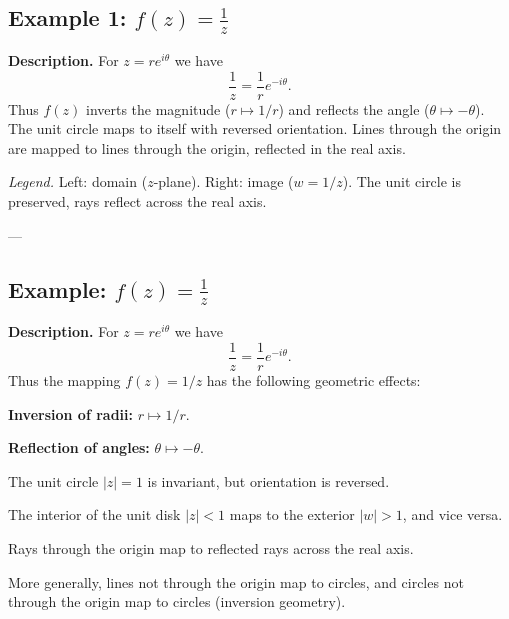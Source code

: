 \begin{problem}[CP-IV-0110]
	\subsection*{Example 1: $f(z) = \tfrac{1}{z}$}

	\textbf{Description.}
	For $z = re^{i\theta}$ we have
	\[
	\frac{1}{z} = \frac{1}{r} e^{-i\theta}.
	\]
	Thus $f(z)$ inverts the magnitude ($r \mapsto 1/r$) and reflects the angle
	($\theta \mapsto -\theta$). The unit circle maps to itself with reversed orientation.
	Lines through the origin are mapped to lines through the origin, reflected in the real axis.

	\begin{center}

		\hspace{1cm}

	\end{center}

	\textit{Legend.} Left: domain ($z$-plane). Right: image ($w=1/z$).
	The unit circle is preserved, rays reflect across the real axis.

	---

\subsection*{Example: $f(z)=\tfrac{1}{z}$}

\textbf{Description.}
For $z = re^{i\theta}$ we have
\[
\frac{1}{z} = \frac{1}{r} e^{-i\theta}.
\]
Thus the mapping $f(z)=1/z$ has the following geometric effects:

	\par\noindent\textbullet\quad \textbf{Inversion of radii:} $r \mapsto 1/r$.
	\par\noindent\textbullet\quad \textbf{Reflection of angles:} $\theta \mapsto -\theta$.
	\par\noindent\textbullet\quad The unit circle $|z|=1$ is invariant, but orientation is reversed.
	\par\noindent\textbullet\quad The interior of the unit disk $|z|<1$ maps to the exterior $|w|>1$, and vice versa.
	\par\noindent\textbullet\quad Rays through the origin map to reflected rays across the real axis.
	\par\noindent\textbullet\quad More generally, lines not through the origin map to circles, and circles not through the origin map to circles (inversion geometry).

\begin{center}


\end{center}
\end{problem}
